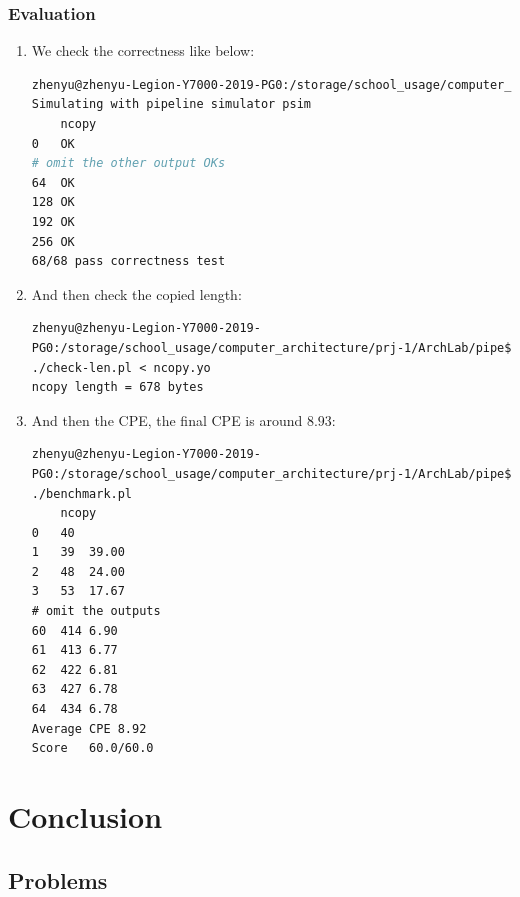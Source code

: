 \documentclass{article}
\begin{document}
\subsubsection{Evaluation}
\begin{enumerate}
    \item We check the correctness like below:
\begin{lstlisting}[language=bash]
zhenyu@zhenyu-Legion-Y7000-2019-PG0:/storage/school_usage/computer_architecture/prj-1/ArchLab/pipe$ ./correctness.pl -p
Simulating with pipeline simulator psim
	ncopy
0	OK
# omit the other output OKs
64	OK
128	OK
192	OK
256	OK
68/68 pass correctness test
\end{lstlisting}
    \item And then check the copied length:
\begin{lstlisting}
zhenyu@zhenyu-Legion-Y7000-2019-PG0:/storage/school_usage/computer_architecture/prj-1/ArchLab/pipe$ ./check-len.pl < ncopy.yo
ncopy length = 678 bytes
\end{lstlisting}
    \item And then the CPE, the final CPE is around $8.93$:
\begin{lstlisting}
zhenyu@zhenyu-Legion-Y7000-2019-PG0:/storage/school_usage/computer_architecture/prj-1/ArchLab/pipe$ ./benchmark.pl
	ncopy
0	40
1	39	39.00
2	48	24.00
3	53	17.67
# omit the outputs
60	414	6.90
61	413	6.77
62	422	6.81
63	427	6.78
64	434	6.78
Average CPE	8.92
Score	60.0/60.0
\end{lstlisting}
\end{enumerate}

\section{Conclusion}

\subsection{Problems}
\end{document}
